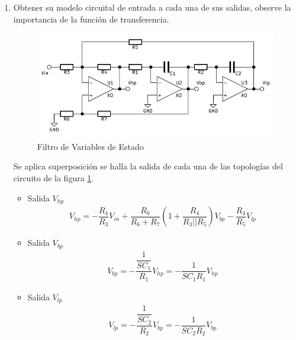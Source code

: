     \begin{enumerate}
        \item Obtener su modelo circuital de entrada a cada una de sus salidas, observe la importancia de la función de transferencia.

             \begin{figure}[H]
                  \centering
                  \includegraphics[width=12cm]{Imagenes/var_estado.png}
                  \caption{Filtro de Variables de Estado}
                  \label{fig:var_estado}
            \end{figure}

            Se aplica superposición se halla la salida de cada una de las topologías del circuito de la figura \ref{fig:var_estado}.

            \begin{itemize}
                \item Salida $V_{hp}$
                    \begin{gather}
                        V_{hp}= -\dfrac{R_4}{R_3}V_{in} + \dfrac{R_6}{R_6+R_7}\left(1+\dfrac{R_4}{R_3||R_5}\right)V_{bp}-\dfrac{R_4}{R_5}V_{lp}
                        \label{eqn:vhp}
                    \end{gather}

                \item Salida $V_{bp}$
                    \begin{gather}
                        V_{bp}=-\dfrac{\dfrac{1}{SC_1}}{R_1}V_{hp}=-\dfrac{1}{SC_1R_1}V_{hp}
                        \label{eqn:vbp}
                    \end{gather}

                \item Salida $V_{lp}$
                    \begin{gather}
                        V_{lp}=-\dfrac{\dfrac{1}{SC_2}}{R_2}V_{bp}=-\dfrac{1}{SC_2R_2}V_{bp}
                        \label{eqn:vlp}
                    \end{gather}
            \end{itemize}


\end{enumerate}
